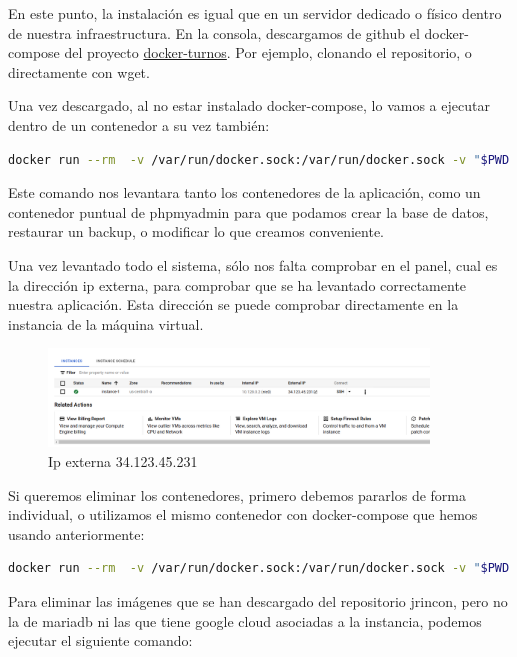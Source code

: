 \documentclass[11pt,spanish,listoffigures,listoftables]{tfgetsinf}
\begin{document}
En este punto, la instalación es igual que en un servidor dedicado o físico dentro de nuestra infraestructura. En la consola, descargamos de github el docker-compose del proyecto \href{https://github.com/jrinconm/docker-turnos/}{docker-turnos}.
Por ejemplo, clonando el repositorio, o directamente con wget. 

Una vez descargado, al no estar instalado docker-compose, lo vamos a ejecutar dentro de un contenedor a su vez también:

\begin{lstlisting}[language=bash, caption={Comando docker para lanzar docker-compose}]
docker run --rm  -v /var/run/docker.sock:/var/run/docker.sock -v "$PWD:$PWD"   -w="$PWD"  docker/compose:1.24.0 up \d
\end{lstlisting}
Este comando nos levantara tanto los contenedores de la aplicación, como un contenedor puntual de phpmyadmin para que podamos crear la base de datos, restaurar un backup, o modificar lo que creamos conveniente.

Una vez levantado todo el sistema, sólo nos falta comprobar en el panel, cual es la dirección ip externa, para comprobar que se ha levantado correctamente nuestra aplicación. Esta dirección se puede comprobar directamente en la instancia de la máquina virtual.
\begin{figure}[h!] %
  \centering
   \includegraphics[width=0.90\textwidth]{img/ipexterna.png}
   \caption{Ip externa 34.123.45.231}
   \label{fig:ipexterna}
 \end{figure}

Si queremos eliminar los contenedores, primero debemos pararlos de forma individual, o utilizamos el mismo contenedor con docker-compose que hemos usando anteriormente:

\begin{lstlisting}[language=bash, caption={Comando docker para parar docker-compose}]
docker run --rm  -v /var/run/docker.sock:/var/run/docker.sock -v "$PWD:$PWD"   -w="$PWD"  docker/compose:1.24.0 down
\end{lstlisting}

Para eliminar las imágenes que se han descargado del repositorio jrincon, pero no la de mariadb ni las que tiene google cloud asociadas a la instancia, podemos ejecutar el siguiente comando:
\end{document}
